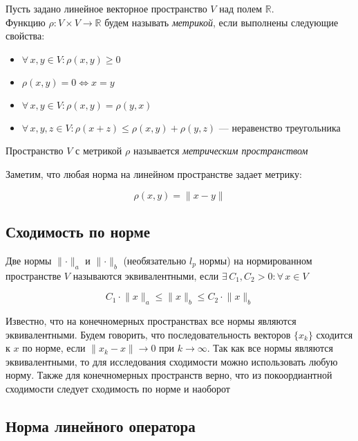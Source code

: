 \begin{definition}
    Пусть задано линейное векторное пространство $V$ над полем $\mathbb{R}$. \\ Функцию $\rho: V \times V \longrightarrow \mathbb{R}$ будем называть \textit{метрикой}, если выполнены следующие свойства:

    \begin{itemize}
        \item $\forall \, x, y \in V: \rho(x, y) \geqslant 0$
        \item $\rho(x, y) = 0 \iff x = y$
        \item $\forall \, x, y \in V: \rho(x, y) = \rho(y, x)$
        \item $\forall \, x, y, z \in V: \rho(x + z) \leqslant \rho(x, y) + \rho(y, z)$  --- неравенство треугольника
    \end{itemize}

    Пространство $V$ с метрикой $\rho$ называется \textit{метрическим пространством}
\end{definition}

Заметим, что любая норма на линейном пространстве задает метрику:

\[
\rho(x, y) = \lVert x - y \rVert
\]

\subsection{Сходимость по норме}

\begin{definition}
    Две нормы $\lVert \cdot \rVert_a$ и $\lVert \cdot \rVert_b$ (необязательно $l_p$ нормы) на нормированном пространстве $V$ называются эквивалентными, если $\exists \, C_1, C_2 > 0: \forall \, x \in V$

    \[
    C_1 \cdot \lVert x \rVert_a \leqslant \lVert x \rVert_b \leqslant C_2 \cdot \lVert x \rVert_b
    \]
\end{definition}

Известно, что на конечномерных пространствах все нормы являются эквивалентными. Будем говорить, что последовательность векторов $\{x_k\}$ сходится к $x$ по норме, если $\lVert x_k - x \rVert \longrightarrow 0$ при $k \longrightarrow \infty$. Так как все нормы являются эквивалентными, то для исследования сходимости можно использовать любую норму. Также для конечномерных пространств верно, что из покоордиантной сходимости следует сходимость по норме и наоборот

\subsection{Норма линейного оператора}

